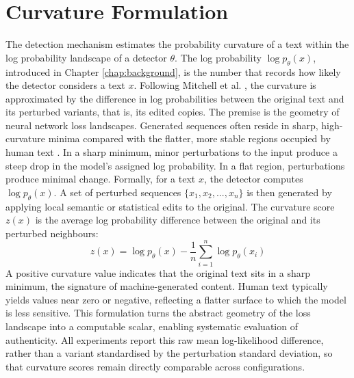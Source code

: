 \documentclass[logo,msc,cs]{infthesis}      %
\begin{document}
\section{Curvature Formulation}
\label{sec:curvature_formulation}
The detection mechanism estimates the probability curvature of a text within the log probability landscape of a detector $\theta$. The log probability $\log p_\theta(x)$, introduced in Chapter \ref{chap:background}, is the number that records how likely the detector considers a text $x$. Following Mitchell et al. \citep{mitchell2023detectgpt}, the curvature is approximated by the difference in log probabilities between the original text and its perturbed variants, that is, its edited copies.
The premise is the geometry of neural network loss landscapes. Generated sequences often reside in sharp, high-curvature minima compared with the flatter, more stable regions occupied by human text \citep{li2018visualizing}. In a sharp minimum, minor perturbations to the input produce a steep drop in the model's assigned log probability. In a flat region, perturbations produce minimal change.
Formally, for a text $x$, the detector computes $\log p_\theta(x)$. A set of perturbed sequences $\{x_1, x_2, ..., x_n\}$ is then generated by applying local semantic or statistical edits to the original. The curvature score $z(x)$ is the average log probability difference between the original and its perturbed neighbours:
\begin{equation}
\label{eq:curvature}
z(x) = \log p_\theta(x) - \frac{1}{n} \sum_{i=1}^{n} \log p_\theta(x_i)
\end{equation}
A positive curvature value indicates that the original text sits in a sharp minimum, the signature of machine-generated content. Human text typically yields values near zero or negative, reflecting a flatter surface to which the model is less sensitive. This formulation turns the abstract geometry of the loss landscape into a computable scalar, enabling systematic evaluation of authenticity. All experiments report this raw mean log-likelihood difference, rather than a variant standardised by the perturbation standard deviation, so that curvature scores remain directly comparable across configurations.
\end{document}
